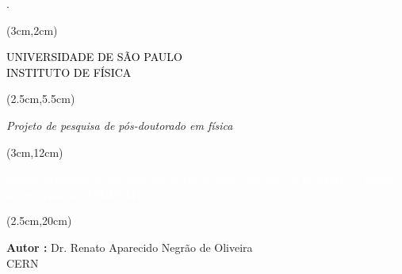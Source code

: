 \begin{titlepage}.
    

    \vspace{3.5cm}

    
    \begin{textblock*}{15cm}(3cm,2cm)
        \begin{Huge}
            \begin{center}
                \makeatletter
                \noindent\textcolor{black}{UNIVERSIDADE DE SÃO PAULO \\ INSTITUTO DE FÍSICA}
                \makeatother
            \end{center}
        \end{Huge}
    \end{textblock*}
    
    \begin{textblock*}{15cm}(2.5cm,5.5cm)
        \makeatletter
        \begin{LARGE}
            \begin{center}
                \color{black}
                {\it Projeto de pesquisa de pós-doutorado em física }\\
            \end{center}
         \end{LARGE}
     
    \end{textblock*}
    
    \begin{textblock*}{15cm}(3cm,12cm)
        \begin{Huge}
            \begin{center}
                \makeatletter
                \noindent\textcolor{white}{Desenvolvimento de um detector de silício para a medida de trajetórias e tempo no experimento ATLAS-LHC}
                \makeatother
            \end{center}
        \end{Huge}
    \end{textblock*}

    \begin{textblock*}{15cm}(2.5cm,20cm)
        \begin{LARGE}
        \begin{center}
            \color{black}
                \textbf{Autor :} Dr. Renato Aparecido Negrão de Oliveira \\ CERN \\ 
        \end{center}
            

\end{LARGE}
\end{textblock*}
\end{titlepage}
